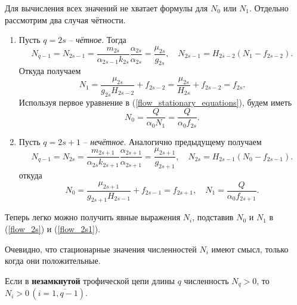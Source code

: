     Для вычисления всех значений не хватает формулы для \(N_0\) или \(N_1\). Отдельно рассмотрим два случая чётности.
    \begin{enumerate}
        \item Пусть \(q = 2s\) -- \textit{чётное}. Тогда
        \begin{equation*}
            N_{q-1} = N_{2s-1} = \frac{m_{2s}}{\alpha_{2s-1} k_{2s}} \frac{\alpha_{2s}}{\alpha_{2s}} = \frac{\mu_{2s}}{g_{2s}}, \quad N_{2s-1} = H_{2s-2} (N_1 - f_{2s-2}).
        \end{equation*}
        Откуда получаем
        \begin{equation*}
            N_1 = \frac{\mu_{2s}}{g_{2s} H_{2s-2}} + f_{2s-2} = \frac{\mu_{2s}}{H_{2s}} + f_{2s-2} = f_{2s}.
        \end{equation*}
        Используя первое уравнение в (\ref{flow_stationary_equations}), будем иметь
        \begin{equation*}
            N_0 = \frac{Q}{\alpha_0 N_1} = \frac{Q}{\alpha_0 f_{2s}}.
        \end{equation*}

        \item Пусть \(q = 2s+1\) -- \textit{нечётное}. Аналогично предыдущему получаем
        \begin{equation*}
            N_{q-1} = N_{2s} = \frac{m_{2s+1}}{\alpha_{2s} k_{2s+1}} \frac{\alpha_{2s+1}}{\alpha_{2s+1}} = \frac{\mu_{2s+1}}{g_{2s+1}}, \quad N_{2s} = H_{2s-1} (N_0 - f_{2s-1}).
        \end{equation*} 
        откуда
        \begin{equation*}
            N_0 = \frac{\mu_{2s+1}}{g_{2s+1} H_{2s-1}} + f_{2s-1} = f_{2s+1}, \quad N_1 = \frac{Q}{\alpha_0 f_{2s+1}}.
        \end{equation*}
    \end{enumerate}

    Теперь легко можно получить явные выражения \(N_i\), подставив \(N_0\) и \( N_1\) в (\ref{flow_2s}) и (\ref{flow_2s1}).

    Очевидно, что стационарные значения численностей \(N_i\) имеют смысл, только когда они положительные.

    \begin{statement}
        Если в \textbf{незамкнутой} трофической цепи длины \(q\) численность \(N_q > 0\), то \(N_i > 0 \, (i=\overline{1,q-1})\).
    \end{statement}

